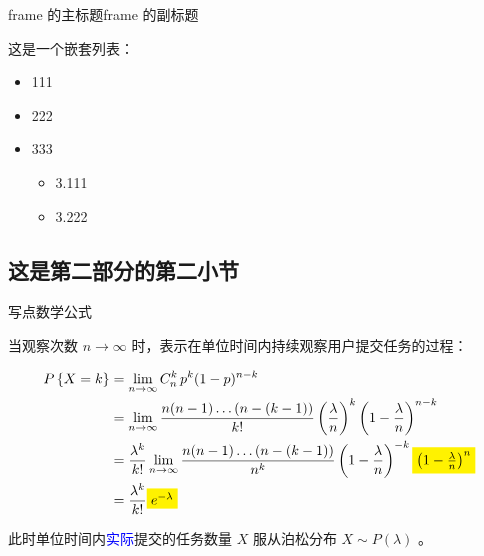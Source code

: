 \documentclass[aspectratio=169]{beamer}
\begin{document}
\begin{frame}{frame 的主标题}{frame 的副标题}

    这是一个嵌套列表：

    \begin{itemize}
        \item 111
        \item 222
        \item 333
              \begin{itemize}
                  \item 3.111
                  \item 3.222
              \end{itemize}
    \end{itemize}

\end{frame}

\subsection{这是第二部分的第二小节}

\begin{frame}{写点数学公式}

    当观察次数 $n \rightarrow \infty$ 时，表示在单位时间内持续观察用户提交任务的过程：

    \begin{equation*}
        \begin{split}
            P\left\{X=k\right\} & = \lim_{n \rightarrow \infty} C_n^k \, p^k (1-p)^{n-k}                                                                                                                              \\
            & = \lim_{n \rightarrow \infty} \frac{n(n-1)\dots(n-(k-1))}{k!} \left(\frac{\lambda}{n}\right)^k \left(1-\frac{\lambda}{n}\right)^{n-k}                                               \\
            & = \frac{\lambda^k}{k!} \lim_{n \rightarrow \infty} \frac{n(n-1)\dots(n-(k-1))}{n^k} \left(1-\frac{\lambda}{n}\right)^{-k} \colorbox{yellow}{$\left(1-\frac{\lambda}{n}\right)^{n}$} \\
            & = \frac{\lambda^k}{k!} \colorbox{yellow}{$e^{-\lambda}$}
        \end{split}
    \end{equation*}

    此时单位时间内\textcolor{blue}{实际}提交的任务数量 $X$ 服从泊松分布 $X \sim P(\lambda)$ 。

\end{frame}
\end{document}
